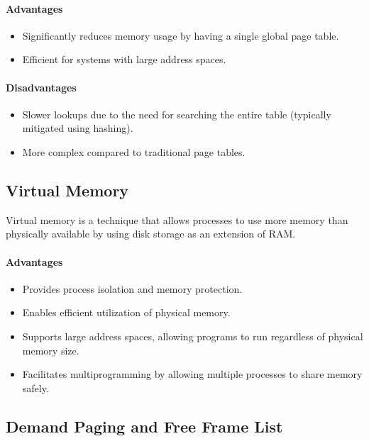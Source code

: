 \documentclass{article}
\begin{document}
\paragraph{Advantages}
\begin{itemize}
    \item Significantly reduces memory usage by having a single global page table.
    \item Efficient for systems with large address spaces.
\end{itemize}

\paragraph{Disadvantages}
\begin{itemize}
    \item Slower lookups due to the need for searching the entire table (typically mitigated using hashing).
    \item More complex compared to traditional page tables.
\end{itemize}

\subsection{Virtual Memory}

Virtual memory is a technique that allows processes to use more memory than physically available by using disk storage as an extension of RAM. 

\paragraph{Advantages}
\begin{itemize}
    \item Provides process isolation and memory protection.
    \item Enables efficient utilization of physical memory.
    \item Supports large address spaces, allowing programs to run regardless of physical memory size.
    \item Facilitates multiprogramming by allowing multiple processes to share memory safely.
\end{itemize}

\subsection{Demand Paging and Free Frame List}
\end{document}

